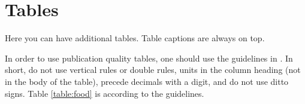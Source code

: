 \documentclass[msc,oneside]{ubcthesis}%
\begin{document}





%


\newpage %
\pagestyle{fancy}\rhead{}\cfoot{}\rfoot{\thepage}


%

\newpage
\pagestyle{headings}

\printindex


\appendix
\addappheadtotoc %
\appendixpage



\chapter{Tables}
Here you can have additional tables. Table captions are always on top.

In order to use publication quality tables, one should use the guidelines in \cite{Fear:2005manual}. In short, do not use vertical rules or double rules, units in the column heading (not in the body of the table), precede decimals with a digit, and do not use ditto signs. Table \ref{table:food} is according to the guidelines. 
\end{document}
